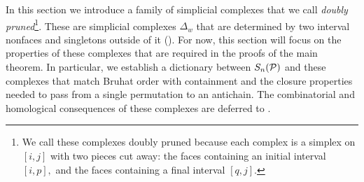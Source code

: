 In this section we introduce a family of simplicial complexes that we call \emph{doubly pruned}\footnote{We call these complexes doubly pruned because each complex is a simplex on $[i, j]$ with two pieces cut away: the faces containing an initial interval $[i, p],$ and the faces containing a final interval $[q, j].$}. These are simplicial complexes $\Delta_w$ that are determined by two interval nonfaces and singletons outside of it (). For now, this section will focus on the properties of these complexes that are required in the proofs of the main theorem. In particular, we establish a dictionary between $S_n(\mathcal{P})$ and these complexes that match Bruhat order with containment and the closure properties needed to pass from a single permutation to an antichain. 
The combinatorial and homological consequences of these complexes are deferred to .

